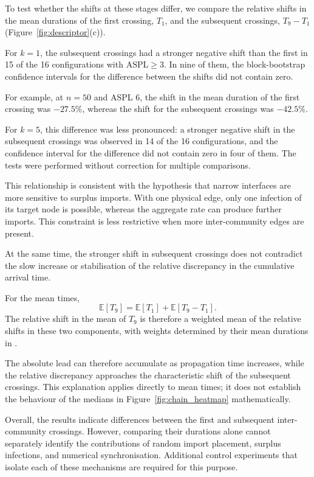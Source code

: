 To test whether the shifts at these stages differ, we compare the relative shifts in the mean durations of the first crossing, $T_1$, and the subsequent crossings, $T_9-T_1$ (Figure~\ref{fig:descriptor}(c)).

For $k=1$, the subsequent crossings had a stronger negative shift than the first in 15 of the 16 configurations with $\mathrm{ASPL}\geq3$. In nine of them, the block-bootstrap confidence intervals for the difference between the shifts did not contain zero.

For example, at $n=50$ and ASPL 6, the shift in the mean duration of the first crossing was $-27.5\%$, whereas the shift for the subsequent crossings was $-42.5\%$.

For $k=5$, this difference was less pronounced: a stronger negative shift in the subsequent crossings was observed in 14 of the 16 configurations, and the confidence interval for the difference did not contain zero in four of them. The tests were performed without correction for multiple comparisons.

This relationship is consistent with the hypothesis that narrow interfaces are more sensitive to surplus imports. With one physical edge, only one infection of its target node is possible, whereas the aggregate rate can produce further imports. This constraint is less restrictive when more inter-community edges are present.

At the same time, the stronger shift in subsequent crossings does not contradict the slow increase or stabilisation of the relative discrepancy in the cumulative arrival time.

For the mean times,
\begin{equation}
\mathbb{E}[T_9]
=
\mathbb{E}[T_1]
+
\mathbb{E}[T_9-T_1].
\end{equation}
The relative shift in the mean of $T_9$ is therefore a weighted mean of the relative shifts in these two components, with weights determined by their mean durations in \Full{}.

The absolute lead can therefore accumulate as propagation time increases, while the relative discrepancy approaches the characteristic shift of the subsequent crossings. This explanation applies directly to mean times; it does not establish the behaviour of the medians in Figure~\ref{fig:chain_heatmap} mathematically.

Overall, the results indicate differences between the first and subsequent inter-community crossings. However, comparing their durations alone cannot separately identify the contributions of random import placement, surplus infections, and numerical synchronisation. Additional control experiments that isolate each of these mechanisms are required for this purpose.
